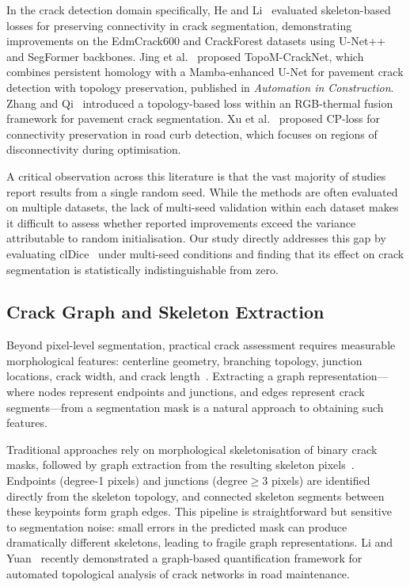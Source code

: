 In the crack detection domain specifically, He and Li~\cite{he2024beyond} evaluated skeleton-based losses for preserving connectivity in crack segmentation, demonstrating improvements on the EdmCrack600 and CrackForest datasets using U-Net++ and SegFormer backbones. Jing et al.~\cite{jing2025topology} proposed TopoM-CrackNet, which combines persistent homology with a Mamba-enhanced U-Net for pavement crack detection with topology preservation, published in \textit{Automation in Construction}. Zhang and Qi~\cite{zhang2024irfusionformer} introduced a topology-based loss within an RGB-thermal fusion framework for pavement crack segmentation. Xu et al.~\cite{xu2021cploss} proposed CP-loss for connectivity preservation in road curb detection, which focuses on regions of disconnectivity during optimisation.

A critical observation across this literature is that the vast majority of studies report results from a single random seed. While the methods are often evaluated on multiple datasets, the lack of multi-seed validation within each dataset makes it difficult to assess whether reported improvements exceed the variance attributable to random initialisation. Our study directly addresses this gap by evaluating clDice~\cite{shit2021cldice} under multi-seed conditions and finding that its effect on crack segmentation is statistically indistinguishable from zero.

\subsection{Crack Graph and Skeleton Extraction}
\label{sec:rw_graph}

Beyond pixel-level segmentation, practical crack assessment requires measurable morphological features: centerline geometry, branching topology, junction locations, crack width, and crack length~\cite{li2024crackquantification, lin2025crackmorph}. Extracting a graph representation---where nodes represent endpoints and junctions, and edges represent crack segments---from a segmentation mask is a natural approach to obtaining such features.

Traditional approaches rely on morphological skeletonisation of binary crack masks, followed by graph extraction from the resulting skeleton pixels~\cite{wang2025crackskeletonization}. Endpoints (degree-1 pixels) and junctions (degree$\geq$3 pixels) are identified directly from the skeleton topology, and connected skeleton segments between these keypoints form graph edges. This pipeline is straightforward but sensitive to segmentation noise: small errors in the predicted mask can produce dramatically different skeletons, leading to fragile graph representations. Li and Yuan~\cite{li2025cracktopology} recently demonstrated a graph-based quantification framework for automated topological analysis of crack networks in road maintenance.


